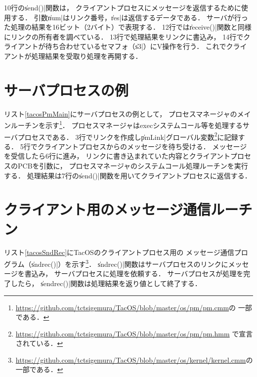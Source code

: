 

10行の\|send()|関数は，
クライアントプロセスにメッセージを返信するために使用する．
引数\|num|はリンク番号，\|res|は返信するデータである．
サーバが行った処理の結果を16ビット（2バイト）で表現する．
12行では\|receive()|関数と同様にリンクの所有者を調べている．
13行で処理結果をリンクに書込み，
14行でクライアントが待ち合わせているセマフォ（\|s3|）にV操作を行う．
これでクライアントが処理結果を受取り処理を再開する．

\section{サーバプロセスの例}
リスト\ref{tacosPmMain}にサーバプロセスの例として，
プロセスマネージャのメインルーチンを示す\footnote{
  \url{https://github.com/tctsigemura/TacOS/blob/master/os/pm/pm.cmm}の
  一部である．}．
プロセスマネージャはexecシステムコール等を処理するサーバプロセスである．
3行でリンクを作成し\|pmLink|グローバル変数\footnote{
  \url{https://github.com/tctsigemura/TacOS/blob/master/os/pm/pm.hmm}
  で宣言されている．}に記録する．
5行でクライアントプロセスからのメッセージを待ち受ける．
メッセージを受信したら6行に進み，
リンクに書き込まれていた内容とクライアントプロセスのPCBを引数に，
プロセスマネージャのシステムコール処理ルーチンを実行する．
処理結果は7行の\|send()|関数を用いてクライアントプロセスに返信する．



\section{クライアント用のメッセージ通信ルーチン}
リスト\ref{tacosSndRec}にTacOSのクライアントプロセス用の
メッセージ通信プログラム（\|sndrec()|）を示す\footnote{
  \url{https://github.com/tctsigemura/TacOS/blob/master/os/kernel/kernel.cmm}の
  一部である．}．
\|sndrec()|関数はサーバプロセスのリンクにメッセージを書込み，
サーバプロセスに処理を依頼する．
サーバプロセスが処理を完了したら，
\|sendrec()|関数は処理結果を返り値として終了する．

